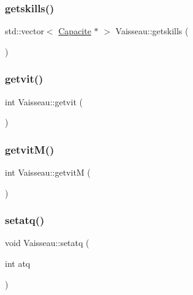 \mbox{\label{class_vaisseau_a40cb016e98f0f928b32b3b4a47e27599}} 
\subsubsection{\texorpdfstring{getskills()}{getskills()}}
{\footnotesize\ttfamily std\+::vector$<$ \hyperlink{class_capacite}{Capacite} $\ast$ $>$ Vaisseau\+::getskills (\begin{DoxyParamCaption}{ }\end{DoxyParamCaption})}

\mbox{\label{class_vaisseau_a3ca57eda788c37034f9769d79f814dac}} 
\subsubsection{\texorpdfstring{getvit()}{getvit()}}
{\footnotesize\ttfamily int Vaisseau\+::getvit (\begin{DoxyParamCaption}{ }\end{DoxyParamCaption})}

\mbox{\label{class_vaisseau_a78f7e268cdb61a39e3292e80309a4ca8}} 
\subsubsection{\texorpdfstring{getvit\+M()}{getvitM()}}
{\footnotesize\ttfamily int Vaisseau\+::getvitM (\begin{DoxyParamCaption}{ }\end{DoxyParamCaption})}

\mbox{\label{class_vaisseau_a5dac2a3814de298d8d515c20b7463397}} 
\subsubsection{\texorpdfstring{setatq()}{setatq()}}
{\footnotesize\ttfamily void Vaisseau\+::setatq (\begin{DoxyParamCaption}\item[{int}]{atq }\end{DoxyParamCaption})}

